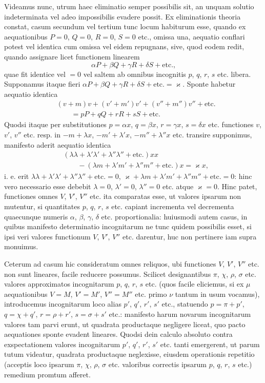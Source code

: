 Videamus nunc, utrum haec eliminatio semper possibilis sit, an unquam
solutio indeterminata vel adeo impossibilis evadere possit. Ex
eliminationis theoria constat, casum secundum vel tertium tunc locum habiturum
esse, quando ex aequationibus $P=0$, $Q=0$, $R=0$, $S=0$ etc., omissa una,
aequatio conflari potest vel identica cum omissa vel eidem repugnans, sive,
quod eodem redit, quando assignare licet functionem linearem
\[
\alpha P+\beta Q+\gamma R+\delta S+\text{etc.,}
\]
quae fit identice vel $=0$ vel saltem ab omnibus incognitis $p$, $q$, $r$, $s$
etc. libera. Supponamus itaque fieri
$\alpha P+\beta Q+\gamma R+\delta S+\text{etc.}=\varkappa$. Sponte habetur
aequatio identica
\[
\begin{aligned}
&(v+m)v+(v'+m')v'+(v''+m'')v''+\text{etc.}\\
&\qquad=pP+qQ+rR+sS+\text{etc.}
\end{aligned}
\]
Quodsi itaque per substitutiones $p=\alpha x$, $q=\beta x$, $r=\gamma x$,
$s=\delta x$ etc. functiones $v$, $v'$, $v''$ etc. resp. in $-m+\lambda x$,
$-m'+\lambda'x$, $-m''+\lambda''x$ etc. transire supponimus, manifesto aderit
aequatio identica
\[
\begin{aligned}
&(\lambda\lambda+\lambda'\lambda'+\lambda''\lambda''+\text{etc.})xx\\
&\qquad-(\lambda m+\lambda'm'+\lambda''m''+\text{etc.})x=\varkappa x,
\end{aligned}
\]
i. e. erit $\lambda\lambda+\lambda'\lambda'+\lambda''\lambda''+\text{etc.}=0$,
$\varkappa+\lambda m+\lambda'm'+\lambda''m''+\text{etc.}=0$: hinc vero
necessario esse debebit $\lambda=0$, $\lambda'=0$, $\lambda''=0$ etc. atque
$\varkappa=0$. Hinc patet, functiones omnes $V$, $V'$, $V''$ etc. ita
comparatas esse, ut valores ipsarum non mutentur, si quantitates $p$, $q$, $r$,
$s$ etc. capiant incrementa vel decrementa quaecunque numeris $\alpha$,
$\beta$, $\gamma$, $\delta$ etc. proportionalia: huiusmodi autem casus, in
quibus manifesto determinatio incognitarum ne tunc quidem possibilis esset,
si ipsi veri valores functionum $V$, $V'$, $V''$ etc. darentur, huc non
pertinere iam supra monuimus.

Ceterum ad casum hic consideratum omnes reliquos, ubi functiones $V$, $V'$,
$V''$ etc. non sunt lineares, facile reducere possumus. Scilicet designantibus
$\pi$, $\chi$, $\rho$, $\sigma$ etc. valores approximatos incognitarum $p$,
$q$, $r$, $s$ etc. (quos facile eliciemus, si ex $\mu$ aequationibus $V=M$,
$V'=M'$, $V''=M''$ etc. primo $\nu$ tantum in usum vocamus), introducemus
incognitarum loco alias $p'$, $q'$, $r'$, $s'$ etc., statuendo $p=\pi+p'$,
$q=\chi+q'$, $r=\rho+r'$, $s=\sigma+s'$ etc.: manifesto harum novarum
incognitarum valores tam parvi erunt, ut quadrata productaque negligere
liceat, quo pacto aequationes sponte evadent lineares. Quodsi dein calculo
absoluto contra exspectationem valores incognitarum $p'$, $q'$, $r'$, $s'$
etc. tanti emergerent, ut parum tutum videatur, quadrata
productaque neglexisse, eiusdem operationis repetitio (acceptis loco ipsarum
$\pi$, $\chi$, $\rho$, $\sigma$ etc. valoribus correctis ipsarum $p$, $q$,
$r$, $s$ etc.) remedium promtum afferet.
